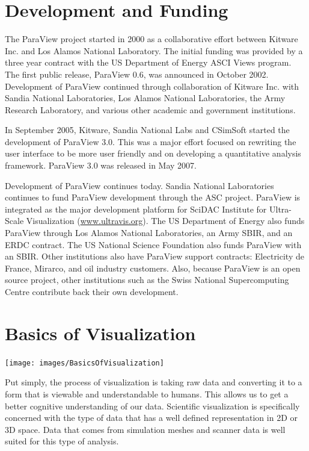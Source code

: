 \section{Development and Funding}

The ParaView project started in 2000 as a collaborative effort between
Kitware Inc. and Los Alamos National Laboratory. The initial funding was
provided by a three year contract with the US Department of Energy ASCI
Views program.  The first public release, ParaView 0.6, was announced in
October 2002.  Development of ParaView continued through collaboration of
Kitware Inc. with Sandia National Laboratories, Los Alamos National
Laboratories, the Army Research Laboratory, and various other academic and
government institutions.

In September 2005, Kitware, Sandia National Labs and CSimSoft started the
development of ParaView 3.0. This was a major effort focused on rewriting
the user interface to be more user friendly and on developing a
quantitative analysis framework. ParaView 3.0 was released in May 2007.

Development of ParaView continues today.  Sandia National Laboratories
continues to fund ParaView development through the ASC project.  ParaView
is integrated as the major development platform for SciDAC Institute for
Ultra-Scale Visualization
(\href{http://www.ultravis.org}{www.ultravis.org}).  The US Department of
Energy also funds ParaView through Los Alamos National Laboratories, an
Army SBIR, and an ERDC contract.  The US National Science Foundation also
funds ParaView with an SBIR.  Other institutions also have ParaView support
contracts: Electricity de France, Mirarco, and oil industry customers.
Also, because ParaView is an open source project, other institutions such
as the Swiss National Supercomputing Centre contribute back their own
development.

\section{Basics of Visualization}

\begin{inlinefig}
  \texttt{[image: images/BasicsOfVisualization]}
\end{inlinefig}

Put simply, the process of visualization is taking raw data and converting
it to a form that is viewable and understandable to humans.  This allows us
to get a better cognitive understanding of our data.  Scientific
visualization is specifically concerned with the type of data that has a
well defined representation in 2D or 3D space.  Data that comes from
simulation meshes and scanner data is well suited for this type of
analysis.


